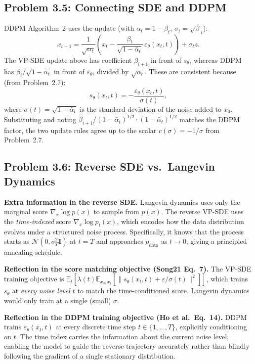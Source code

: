 \documentclass[11pt]{article}
\newcommand{\E}{\mathbb{E}}
\newcommand{\N}{\mathcal{N}}
\newcommand{\abar}{\bar{\alpha}}
\newcommand{\epsth}{\varepsilon_\theta}
\begin{document}
\subsection{Problem 3.5: Connecting SDE and DDPM}

DDPM Algorithm~2 uses the update (with $\alpha_t=1-\beta_t$, $\sigma_t=\sqrt\beta_t$):
\[
x_{t-1} = \frac{1}{\sqrt{\alpha_t}}\!\left(x_t
  - \frac{\beta_t}{\sqrt{1-\abar_t}}\,\epsth(x_t,t)\right) + \sigma_t z.
\]
The VP-SDE update above has coefficient $\beta_{i+1}$ in front of $s_\theta$,
whereas DDPM has $\beta_t/\sqrt{1-\abar_t}$ in front of $\epsth$, divided by
$\sqrt{\alpha_{t}}$.  These are consistent because (from Problem~2.7):
\[
s_\theta(x_t,t) = -\frac{\epsth(x_t,t)}{\sigma(t)},
\]
where $\sigma(t)=\sqrt{1-\abar_t}$ is the standard deviation of the noise added
to $x_0$.  Substituting and noting $\beta_{i+1}/(1-\abar_t)^{1/2} \cdot (1-\abar_t)^{1/2}$ matches the DDPM factor, the two update rules agree up to the scalar $c(\sigma)=-1/\sigma$ from Problem~2.7.

\subsection{Problem 3.6: Reverse SDE vs.\ Langevin Dynamics}

\textbf{Extra information in the reverse SDE.}
Langevin dynamics uses only the marginal score $\nabla_x\log p(x)$ to sample from $p(x)$.
The reverse VP-SDE uses the \emph{time-indexed} score $\nabla_x\log p_t(x)$, which encodes
how the data distribution evolves under a structured noise process.  Specifically, it knows
that the process starts as $\N(0,\sigma_T^2\mathbf{I})$ at $t=T$ and approaches $p_\mathrm{data}$
as $t\to 0$, giving a principled annealing schedule.

\textbf{Reflection in the score matching objective (Song21 Eq.~7).}
The VP-SDE training objective is
$\E_t[\lambda(t)\E_{x_0,x_t}[\|s_\theta(x_t,t)+\varepsilon/\sigma(t)\|^2]]$,
which trains $s_\theta$ at \emph{every noise level $t$} to match the time-conditioned
score.  Langevin dynamics would only train at a single (small) $\sigma$.

\textbf{Reflection in the DDPM training objective (Ho et al.\ Eq.~14).}
DDPM trains $\epsth(x_t,t)$ at every discrete time step $t\in\{1,\ldots,T\}$,
explicitly conditioning on $t$.  The time index carries the information about
the current noise level, enabling the model to guide the reverse trajectory
accurately rather than blindly following the gradient of a single stationary distribution.
\end{document}

